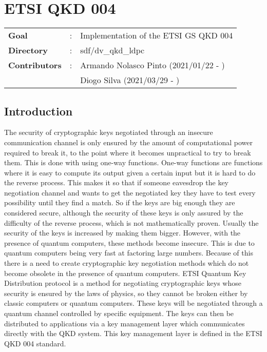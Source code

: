 \clearpage\clearpage
\graphicspath{{sdf/key_management_layer/figures/}}
\acresetall


\section{ETSI QKD 004}
\label{etsi_004}
\setcounter{tocdepth}{3}
\setcounter{secnumdepth}{3}

\begin{refsection}
	\begin{tcolorbox}
		\begin{tabular}{p{2.75cm} p{0.2cm} p{10.5cm}}
			\textbf{Goal}          &:& Implementation of the ETSI GS QKD 004\\
			\textbf{Directory}     &:& sdf/dv\_qkd\_ldpc\\
			\textbf{Contributors}   &:& Armando Nolasco Pinto (2021/01/22 - ) \\
									&& Diogo Silva (2021/03/29 - ) \\
		\end{tabular}
	\end{tcolorbox}



\subsection{Introduction}

The security of cryptographic keys negotiated through an insecure communication channel is only ensured by the amount of computational power required to break it, to the point where it becomes unpractical to try to break them. 
This is done with using one-way functions. One-way functions are functions where it is easy to compute its output given a certain input but it is hard to do the reverse process. This makes it so that if someone eavesdrop the key negotiation channel and wants to get the negotiated key they have to test every possibility until they find a match. So if the keys are big enough they are considered secure, although the security of these keys is only assured by the difficulty of the reverse process, which is not mathematically proven. Usually the security of the keys is increased by making them bigger. However, with the presence of quantum computers, these methods become insecure. This is due to quantum computers being very fast at factoring large numbers. Because of this there is a need to create cryptographic key negotiation methods which do not become obsolete in the presence of quantum computers. ETSI Quantum Key Distribution protocol is a method for negotiating cryptographic keys whose security is ensured by the laws of physics, so they cannot be broken either by classic computers or quantum computers. These keys will be negotiated through a quantum channel controlled by specific equipment. The keys can then be distributed to applications via a key management layer which communicates directly with the QKD system. This key management layer is defined in the ETSI QKD 004 standard. 


\end{refsection}
